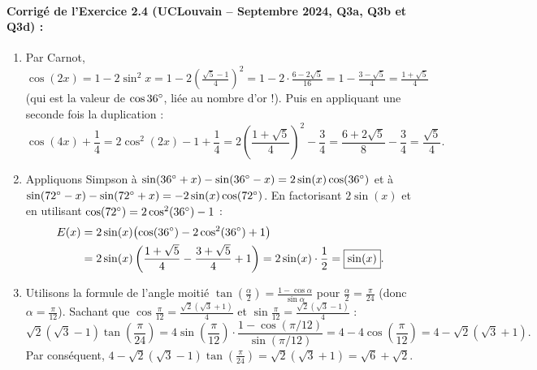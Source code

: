 \paragraph{Corrigé de l'Exercice 2.4 (UCLouvain -- Septembre 2024, Q3a, Q3b et Q3d) :}
\begin{enumerate}[label=(\alph*)]
    \item Par Carnot, $\cos(2x) = 1 - 2\sin^2 x = 1 - 2\left(\frac{\sqrt{5}-1}{4}\right)^2 = 1 - 2\cdot\frac{6 - 2\sqrt{5}}{16} = 1 - \frac{3-\sqrt{5}}{4} = \frac{1+\sqrt{5}}{4}$ (qui est la valeur de $\cos 36\degree$, liée au nombre d'or !). Puis en appliquant une seconde fois la duplication :
    \[
        \cos(4x) + \frac{1}{4} = 2\cos^2(2x) - 1 + \frac{1}{4} = 2\left(\frac{1+\sqrt{5}}{4}\right)^2 - \frac{3}{4} = \frac{6+2\sqrt{5}}{8} - \frac{3}{4} = \boxed{\frac{\sqrt{5}}{4}}.
    \]
    \item Appliquons Simpson à $\sin(36\degree+x) - \sin(36\degree-x) = 2\sin(x)\cos(36\degree)$ et à $\sin(72\degree-x) - \sin(72\degree+x) = -2\sin(x)\cos(72\degree)$. En factorisant $2\sin(x)$ et en utilisant $\cos(72\degree) = 2\cos^2(36\degree) - 1$ :
    \begin{align*}
        E(x) &= 2\sin(x)\bigl(\cos(36\degree) - 2\cos^2(36\degree) + 1\bigr) \\
        &= 2\sin(x)\left(\frac{1+\sqrt{5}}{4} - \frac{3+\sqrt{5}}{4} + 1\right) = 2\sin(x)\cdot\frac{1}{2} = \boxed{\sin(x)}.
    \end{align*}
    \item Utilisons la formule de l'angle moitié $\tan\left(\frac{\alpha}{2}\right) = \frac{1 - \cos\alpha}{\sin\alpha}$ pour $\frac{\alpha}{2} = \frac{\pi}{24}$ (donc $\alpha = \frac{\pi}{12}$). Sachant que $\cos\frac{\pi}{12} = \frac{\sqrt{2}(\sqrt{3}+1)}{4}$ et $\sin\frac{\pi}{12} = \frac{\sqrt{2}(\sqrt{3}-1)}{4}$ :
    \[
        \sqrt{2}(\sqrt{3}-1)\tan\left(\frac{\pi}{24}\right) = 4\sin\left(\frac{\pi}{12}\right)\cdot\frac{1 - \cos(\pi/12)}{\sin(\pi/12)} = 4 - 4\cos\left(\frac{\pi}{12}\right) = 4 - \sqrt{2}(\sqrt{3}+1).
    \]
    Par conséquent, $4 - \sqrt{2}(\sqrt{3}-1)\tan\left(\frac{\pi}{24}\right) = \boxed{\sqrt{2}(\sqrt{3}+1) = \sqrt{6} + \sqrt{2}}$.
\end{enumerate}

